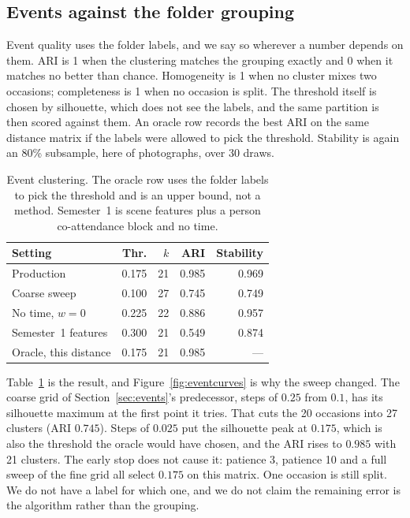\documentclass[conference]{IEEEtran}
\begin{document}
\subsection{Events against the folder grouping}
\label{sec:events-eval}

Event quality uses the folder labels, and we say so wherever a number depends
on them. ARI is 1 when the clustering matches the grouping exactly and 0 when
it matches no better than chance. Homogeneity is 1 when no cluster mixes two
occasions; completeness is 1 when no occasion is split. The threshold itself
is chosen by silhouette, which does not see the labels, and the same partition
is then scored against them. An oracle row records the best ARI on the same
distance matrix if the labels were allowed to pick the threshold. Stability is
again an 80\% subsample, here of photographs, over 30 draws.

\begin{table}[t]
\caption{Event clustering. The oracle row uses the folder labels to pick the
threshold and is an upper bound, not a method. Semester~1 is scene features
plus a person co-attendance block and no time.}
\label{tab:events}
\centering
\scriptsize
\begin{tabular}{@{}>{\raggedright\arraybackslash}p{2.15cm}rrrr@{}}
\toprule
Setting & Thr. & $k$ & ARI & Stability \\
\midrule
Production & 0.175 & 21 & 0.985 & 0.969 \\
Coarse sweep & 0.100 & 27 & 0.745 & 0.749 \\
No time, $w{=}0$ & 0.225 & 22 & 0.886 & 0.957 \\
Semester~1 features & 0.300 & 21 & 0.549 & 0.874 \\
Oracle, this distance & 0.175 & 21 & 0.985 & --- \\
\bottomrule
\end{tabular}
\end{table}

Table~\ref{tab:events} is the result, and Figure~\ref{fig:eventcurves} is why
the sweep changed. The coarse grid of Section~\ref{sec:events}'s predecessor,
steps of $0.25$ from $0.1$, has its silhouette maximum at the first point it
tries. That cuts the 20 occasions into 27 clusters (ARI $0.745$). Steps of
$0.025$ put the silhouette peak at $0.175$, which is also the threshold the
oracle would have chosen, and the ARI rises to $0.985$ with 21 clusters. The
early stop does not cause it: patience 3, patience 10 and a full sweep of the
fine grid all select $0.175$ on this matrix. One occasion is still split. We
do not have a label for which one, and we do not claim the remaining error is
the algorithm rather than the grouping.
\end{document}
